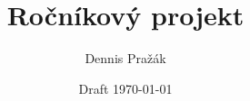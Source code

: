 \documentclass[12pt,a4paper]{report}
\let\openright=\clearpage
\begin{document}
\title{Ročníkový projekt}
\author{Dennis Pražák}
\date{Draft \today}
\maketitle


\tableofcontents





% 

\listoffigures

\listoftables






\openright
\end{document}
